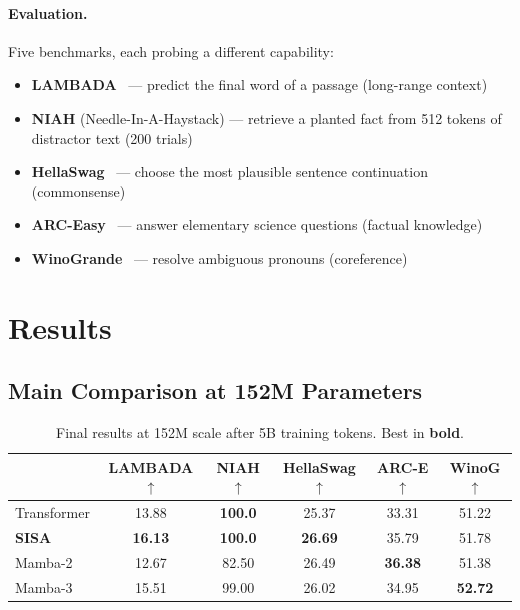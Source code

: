 \documentclass[11pt]{article}
\begin{document}
\paragraph{Evaluation.} Five benchmarks, each probing a different capability:
\begin{itemize}
\setlength\itemsep{0.1em}
\item \textbf{LAMBADA}~\citep{lambada} --- predict the final word of a passage (long-range context)
\item \textbf{NIAH} (Needle-In-A-Haystack) --- retrieve a planted fact from 512 tokens of distractor text (200 trials)
\item \textbf{HellaSwag}~\citep{hellaswag} --- choose the most plausible sentence continuation (commonsense)
\item \textbf{ARC-Easy}~\citep{arc} --- answer elementary science questions (factual knowledge)
\item \textbf{WinoGrande}~\citep{winogrande} --- resolve ambiguous pronouns (coreference)
\end{itemize}

\section{Results}

\subsection{Main Comparison at 152M Parameters}

\begin{table}[h]
\centering
\caption{Final results at 152M scale after 5B training tokens. Best in \textbf{bold}.}
\label{tab:main}
\begin{tabular}{lccccc}
\toprule
& \textbf{LAMBADA}$\uparrow$ & \textbf{NIAH}$\uparrow$ & \textbf{HellaSwag}$\uparrow$ & \textbf{ARC-E}$\uparrow$ & \textbf{WinoG}$\uparrow$ \\
\midrule
Transformer & 13.88 & \textbf{100.0} & 25.37 & 33.31 & 51.22 \\
\textbf{SISA} & \textbf{16.13} & \textbf{100.0} & \textbf{26.69} & 35.79 & 51.78 \\
Mamba-2 & 12.67 & 82.50 & 26.49 & \textbf{36.38} & 51.38 \\
Mamba-3 & 15.51 & 99.00 & 26.02 & 34.95 & \textbf{52.72} \\
\bottomrule
\end{tabular}
\end{table}
\end{document}
